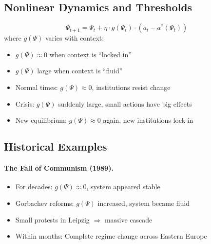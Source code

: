 \subsection{Nonlinear Dynamics and Thresholds}

\begin{definition}
\begin{equation}
\Psi_{t+1} = \Psi_t + \eta \cdot g(\Psi_t) \cdot (a_t - a^*(\Psi_t))
\label{eq:nonlinear-context}
\end{equation}
where $g(\Psi)$ varies with context:
\begin{itemize}[nosep]
  \item $g(\Psi) \approx 0$ when context is ``locked in''
  \item $g(\Psi)$ large when context is ``fluid''
\end{itemize}
\end{definition}

\begin{intuition}
\begin{itemize}[nosep]
  \item Normal times: $g(\Psi) \approx 0$, institutions resist change
  \item Crisis: $g(\Psi)$ suddenly large, small actions have big effects
  \item New equilibrium: $g(\Psi) \approx 0$ again, new institutions lock in
\end{itemize}
\end{intuition}

\subsection{Historical Examples}

\paragraph{The Fall of Communism (1989).}
\begin{itemize}[nosep]
  \item For decades: $g(\Psi) \approx 0$, system appeared stable
  \item Gorbachev reforms: $g(\Psi)$ increased, system became fluid
  \item Small protests in Leipzig $\Rightarrow$ massive cascade
  \item Within months: Complete regime change across Eastern Europe
\end{itemize}

